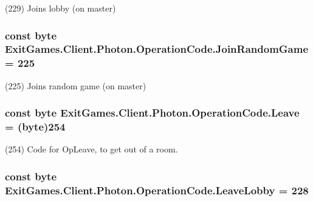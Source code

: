 (229) Joins lobby (on master)

\subsubsection[{\texorpdfstring{Join\+Random\+Game}{JoinRandomGame}}]{\setlength{\rightskip}{0pt plus 5cm}const byte Exit\+Games.\+Client.\+Photon.\+Operation\+Code.\+Join\+Random\+Game = 225}\hypertarget{class_exit_games_1_1_client_1_1_photon_1_1_operation_code_a43219f5aad29ff41925811ef959dd442}{}\label{class_exit_games_1_1_client_1_1_photon_1_1_operation_code_a43219f5aad29ff41925811ef959dd442}


(225) Joins random game (on master)

\subsubsection[{\texorpdfstring{Leave}{Leave}}]{\setlength{\rightskip}{0pt plus 5cm}const byte Exit\+Games.\+Client.\+Photon.\+Operation\+Code.\+Leave = (byte)254}\hypertarget{class_exit_games_1_1_client_1_1_photon_1_1_operation_code_aa11e391e152516015f509f474f6ac7ce}{}\label{class_exit_games_1_1_client_1_1_photon_1_1_operation_code_aa11e391e152516015f509f474f6ac7ce}


(254) Code for Op\+Leave, to get out of a room.

\subsubsection[{\texorpdfstring{Leave\+Lobby}{LeaveLobby}}]{\setlength{\rightskip}{0pt plus 5cm}const byte Exit\+Games.\+Client.\+Photon.\+Operation\+Code.\+Leave\+Lobby = 228}\hypertarget{class_exit_games_1_1_client_1_1_photon_1_1_operation_code_ac9483ca214470e195bd3b4558aee3a08}{}\label{class_exit_games_1_1_client_1_1_photon_1_1_operation_code_ac9483ca214470e195bd3b4558aee3a08}


